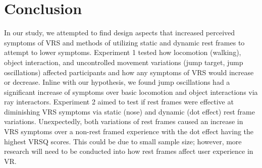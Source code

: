 \documentclass[sigconf]{acmart}
\begin{document}
\section{Conclusion}
In our study, we attempted to find design aspects that increased perceived symptoms of VRS and methods of utilizing static and dynamic rest frames to attempt to lower symptoms. Experiment 1 tested how locomotion (walking), object interaction, and uncontrolled movement variations (jump target, jump oscillations) affected participants and how any symptoms of VRS would increase or decrease. Inline with our hypothesis, we found jump oscillations had a significant increase of symptoms over basic locomotion and object interactions via ray interactors. Experiment 2 aimed to test if rest frames were effective at diminishing VRS symptoms via static (nose) and dynamic (dot effect) rest frame variations. Unexpectedly, both variations of rest frames caused an increase in VRS symptoms over a non-rest framed experience with the dot effect having the highest VRSQ scores. This could be due to small sample size; however, more research will need to be conducted into how rest frames affect user experience in VR. 




\appendix
\end{document}
